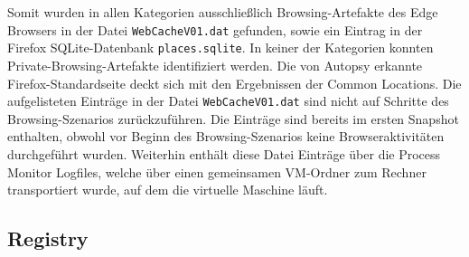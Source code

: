 \begin{appendices}
Somit wurden in allen Kategorien ausschließlich Browsing-Artefakte des Edge Browsers in der Datei \texttt{WebCacheV01.dat} gefunden, sowie ein Eintrag in der Firefox SQLite-Datenbank \texttt{places.sqlite}. In keiner der Kategorien konnten Private-Browsing-Artefakte identifiziert werden. Die von Autopsy erkannte Firefox-Standardseite deckt sich mit den Ergebnissen der Common Locations. Die aufgelisteten Einträge in der Datei \texttt{WebCacheV01.dat} sind nicht auf Schritte des Browsing-Szenarios zurückzuführen. Die Einträge sind bereits im ersten Snapshot enthalten, obwohl vor Beginn des Browsing-Szenarios keine Browseraktivitäten durchgeführt wurden. Weiterhin enthält diese Datei Einträge über die Process Monitor Logfiles, welche über einen gemeinsamen VM-Ordner zum Rechner transportiert wurde, auf dem die virtuelle Maschine läuft.


\subsection{Registry}
\label{subsection:appendix-firefox-registry}


\end{appendices}
